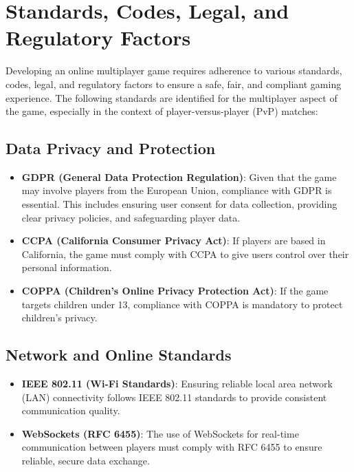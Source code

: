 \newpage
\section{Standards, Codes, Legal, and Regulatory Factors}    

Developing an online multiplayer game requires adherence to various standards, codes, legal, and regulatory factors to ensure a safe, fair, and compliant gaming experience. The following standards are identified for the multiplayer aspect of the game, especially in the context of player-versus-player (PvP) matches:

\subsection{Data Privacy and Protection}
\begin{itemize}
    \item \textbf{GDPR (General Data Protection Regulation)}: Given that the game may involve players from the European Union, compliance with GDPR is essential. This includes ensuring user consent for data collection, providing clear privacy policies, and safeguarding player data.
    \item \textbf{CCPA (California Consumer Privacy Act)}: If players are based in California, the game must comply with CCPA to give users control over their personal information.
    \item \textbf{COPPA (Children's Online Privacy Protection Act)}: If the game targets children under 13, compliance with COPPA is mandatory to protect children’s privacy.
\end{itemize}

\subsection{Network and Online Standards}
\begin{itemize}
    \item \textbf{IEEE 802.11 (Wi-Fi Standards)}: Ensuring reliable local area network (LAN) connectivity follows IEEE 802.11 standards to provide consistent communication quality.
    \item \textbf{WebSockets (RFC 6455)}: The use of WebSockets for real-time communication between players must comply with RFC 6455 to ensure reliable, secure data exchange.
\end{itemize}

